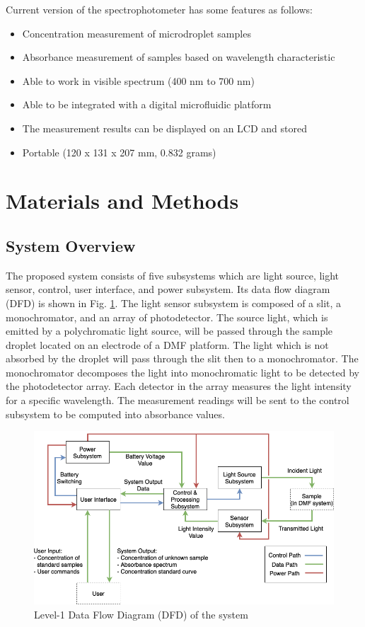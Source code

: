 \documentclass[conference]{IEEEtran}
\begin{document}
Current version of the spectrophotometer has some features as follows:
\begin{itemize}
    \item Concentration measurement of microdroplet samples 
    \item Absorbance measurement of samples based on wavelength characteristic 
    \item Able to work in visible spectrum (400 nm to 700 nm) 
    \item Able to be integrated with a digital microfluidic platform 
    \item The measurement results can be displayed on an LCD and stored 
    \item Portable (120 x 131 x 207 mm, 0.832 grams)
\end{itemize}

\section{Materials and Methods}
\subsection{System Overview}
The proposed system consists of five subsystems which are light source, light sensor, control, user interface, and power subsystem. Its data flow diagram (DFD) is shown in Fig. \ref{system-dfd}. The light sensor subsystem is composed of a slit, a monochromator, and an array of photodetector. The source light, which is emitted by a polychromatic light source, will be passed through the sample droplet located on an electrode of a DMF platform. The light which is not absorbed by the droplet will pass through the slit then to a monochromator. The monochromator decomposes the light into monochromatic light to be detected by the photodetector array. Each detector in the array measures the light intensity for a specific wavelength. The measurement readings will be sent to the control subsystem to be computed into absorbance values. 

    \begin{figure}[htbp]
    \centerline{\includegraphics[scale=0.27]{system-dfd.png}}
    \caption{Level-1 Data Flow Diagram (DFD) of the system}
    \label{system-dfd}
    \end{figure}
\end{document}
